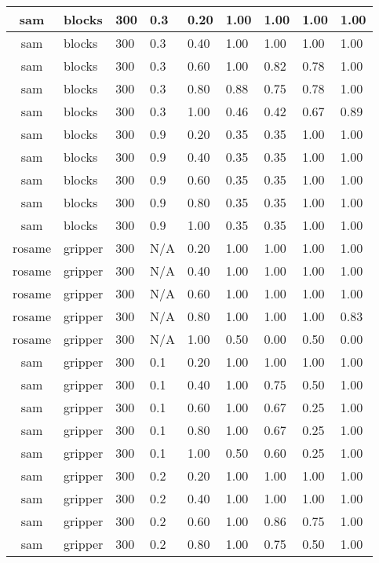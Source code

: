 \begin{table}[ht]
\begin{tabular}{c}
sam & blocks & 300 & 0.3 & 0.20 & 1.00 & 1.00 & 1.00 & 1.00 \\ \hline
sam & blocks & 300 & 0.3 & 0.40 & 1.00 & 1.00 & 1.00 & 1.00 \\ \hline
sam & blocks & 300 & 0.3 & 0.60 & 1.00 & 0.82 & 0.78 & 1.00 \\ \hline
sam & blocks & 300 & 0.3 & 0.80 & 0.88 & 0.75 & 0.78 & 1.00 \\ \hline
sam & blocks & 300 & 0.3 & 1.00 & 0.46 & 0.42 & 0.67 & 0.89 \\ \hline
sam & blocks & 300 & 0.9 & 0.20 & 0.35 & 0.35 & 1.00 & 1.00 \\ \hline
sam & blocks & 300 & 0.9 & 0.40 & 0.35 & 0.35 & 1.00 & 1.00 \\ \hline
sam & blocks & 300 & 0.9 & 0.60 & 0.35 & 0.35 & 1.00 & 1.00 \\ \hline
sam & blocks & 300 & 0.9 & 0.80 & 0.35 & 0.35 & 1.00 & 1.00 \\ \hline
sam & blocks & 300 & 0.9 & 1.00 & 0.35 & 0.35 & 1.00 & 1.00 \\ \hline
rosame & gripper & 300 & N/A & 0.20 & 1.00 & 1.00 & 1.00 & 1.00 \\ \hline
rosame & gripper & 300 & N/A & 0.40 & 1.00 & 1.00 & 1.00 & 1.00 \\ \hline
rosame & gripper & 300 & N/A & 0.60 & 1.00 & 1.00 & 1.00 & 1.00 \\ \hline
rosame & gripper & 300 & N/A & 0.80 & 1.00 & 1.00 & 1.00 & 0.83 \\ \hline
rosame & gripper & 300 & N/A & 1.00 & 0.50 & 0.00 & 0.50 & 0.00 \\ \hline
sam & gripper & 300 & 0.1 & 0.20 & 1.00 & 1.00 & 1.00 & 1.00 \\ \hline
sam & gripper & 300 & 0.1 & 0.40 & 1.00 & 0.75 & 0.50 & 1.00 \\ \hline
sam & gripper & 300 & 0.1 & 0.60 & 1.00 & 0.67 & 0.25 & 1.00 \\ \hline
sam & gripper & 300 & 0.1 & 0.80 & 1.00 & 0.67 & 0.25 & 1.00 \\ \hline
sam & gripper & 300 & 0.1 & 1.00 & 0.50 & 0.60 & 0.25 & 1.00 \\ \hline
sam & gripper & 300 & 0.2 & 0.20 & 1.00 & 1.00 & 1.00 & 1.00 \\ \hline
sam & gripper & 300 & 0.2 & 0.40 & 1.00 & 1.00 & 1.00 & 1.00 \\ \hline
sam & gripper & 300 & 0.2 & 0.60 & 1.00 & 0.86 & 0.75 & 1.00 \\ \hline
sam & gripper & 300 & 0.2 & 0.80 & 1.00 & 0.75 & 0.50 & 1.00 \\ \hline

\end{tabular}
\end{table}
